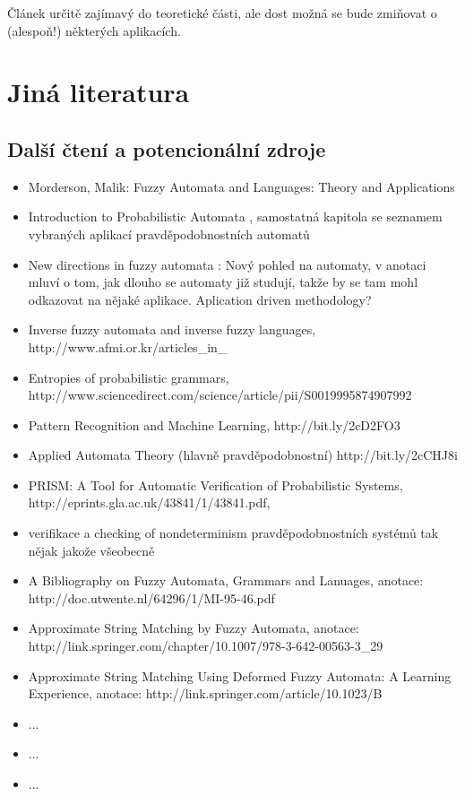 \documentclass[a4paper,10pt]{article}
\begin{document}
Článek určitě zajímavý do teoretické části, ale dost možná se bude zmiňovat o (alespoň!) některých aplikacích.



\section{Jiná literatura}

\subsection{Další čtení a potencionální zdroje}
\begin{itemize}
 \item Morderson, Malik: Fuzzy Automata and Languages: Theory and Applications \cite{MorMal-FuzzAutAndLangs}
 \item Introduction to Probabilistic Automata \cite{Paz-IntroProbAut}, samostatná kapitola se seznamem vybraných aplikací pravděpodobnostních automatů
 \item New directions in fuzzy automata \cite{DooKre-NewDirFuzzAut}: Nový pohled na automaty, v anotaci mluví o tom, jak dlouho se automaty již studují, takže by se tam mohl odkazovat na nějaké aplikace. Aplication driven methodology?
 \item Inverse fuzzy automata and inverse fuzzy languages, http://www.afmi.or.kr/articles\_in\_%
 \item Entropies of probabilistic grammars, http://www.sciencedirect.com/science/article/pii/S0019995874907992
 \item Pattern Recognition and Machine Learning, http://bit.ly/2cD2FO3
 \item Applied Automata Theory (hlavně pravděpodobnostní) http://bit.ly/2cCHJ8i
 \item PRISM: A Tool for Automatic Verification of Probabilistic Systems, http://eprints.gla.ac.uk/43841/1/43841.pdf,
 \item verifikace a checking of nondeterminism pravděpodobnostních systémů tak nějak jakože všeobecně
 \item A Bibliography on Fuzzy Automata, Grammars and Lanuages, anotace: http://doc.utwente.nl/64296/1/MI-95-46.pdf
 \item Approximate String Matching by Fuzzy Automata, anotace: http://link.springer.com/chapter/10.1007/978-3-642-00563-3_29
 \item Approximate String Matching Using Deformed Fuzzy Automata: A Learning Experience, anotace: http://link.springer.com/article/10.1023/B%
 \item ...
 \item ...
 \item ...
 
\end{itemize}
\end{document}
